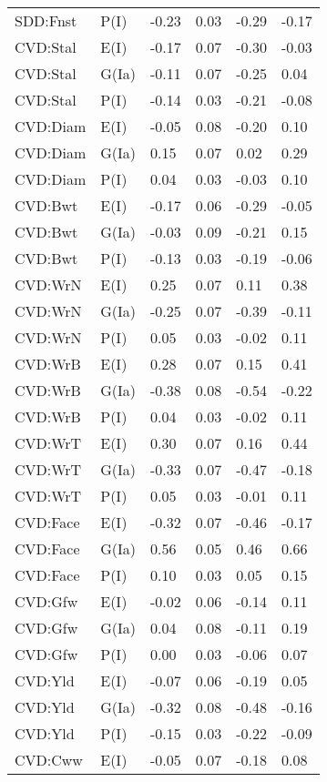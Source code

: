 \begin{center}
\begin{longtable}{|p{1.1in}|p{0.7in}|p{0.7in}|p{0.6in}|p{0.6in}|p{0.6in}|}
  SDD:Fnst & P(I) & -0.23 & 0.03 & -0.29 & -0.17 \\ 
  CVD:Stal & E(I) & -0.17 & 0.07 & -0.30 & -0.03 \\ 
  CVD:Stal & G(Ia) & -0.11 & 0.07 & -0.25 & 0.04 \\ 
  CVD:Stal & P(I) & -0.14 & 0.03 & -0.21 & -0.08 \\ 
  CVD:Diam & E(I) & -0.05 & 0.08 & -0.20 & 0.10 \\ 
  CVD:Diam & G(Ia) & 0.15 & 0.07 & 0.02 & 0.29 \\ 
  CVD:Diam & P(I) & 0.04 & 0.03 & -0.03 & 0.10 \\ 
  CVD:Bwt & E(I) & -0.17 & 0.06 & -0.29 & -0.05 \\ 
  CVD:Bwt & G(Ia) & -0.03 & 0.09 & -0.21 & 0.15 \\ 
  CVD:Bwt & P(I) & -0.13 & 0.03 & -0.19 & -0.06 \\ 
  CVD:WrN & E(I) & 0.25 & 0.07 & 0.11 & 0.38 \\ 
  CVD:WrN & G(Ia) & -0.25 & 0.07 & -0.39 & -0.11 \\ 
  CVD:WrN & P(I) & 0.05 & 0.03 & -0.02 & 0.11 \\ 
  CVD:WrB & E(I) & 0.28 & 0.07 & 0.15 & 0.41 \\ 
  CVD:WrB & G(Ia) & -0.38 & 0.08 & -0.54 & -0.22 \\ 
  CVD:WrB & P(I) & 0.04 & 0.03 & -0.02 & 0.11 \\ 
  CVD:WrT & E(I) & 0.30 & 0.07 & 0.16 & 0.44 \\ 
  CVD:WrT & G(Ia) & -0.33 & 0.07 & -0.47 & -0.18 \\ 
  CVD:WrT & P(I) & 0.05 & 0.03 & -0.01 & 0.11 \\ 
  CVD:Face & E(I) & -0.32 & 0.07 & -0.46 & -0.17 \\ 
  CVD:Face & G(Ia) & 0.56 & 0.05 & 0.46 & 0.66 \\ 
  CVD:Face & P(I) & 0.10 & 0.03 & 0.05 & 0.15 \\ 
  CVD:Gfw & E(I) & -0.02 & 0.06 & -0.14 & 0.11 \\ 
  CVD:Gfw & G(Ia) & 0.04 & 0.08 & -0.11 & 0.19 \\ 
  CVD:Gfw & P(I) & 0.00 & 0.03 & -0.06 & 0.07 \\ 
  CVD:Yld & E(I) & -0.07 & 0.06 & -0.19 & 0.05 \\ 
  CVD:Yld & G(Ia) & -0.32 & 0.08 & -0.48 & -0.16 \\ 
  CVD:Yld & P(I) & -0.15 & 0.03 & -0.22 & -0.09 \\ 
  CVD:Cww & E(I) & -0.05 & 0.07 & -0.18 & 0.08 \\ 

\end{longtable}
\end{center}
